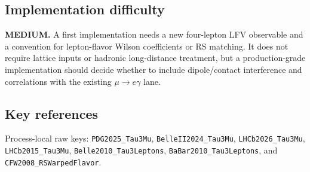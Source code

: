 \subsection*{Implementation difficulty}
\textbf{MEDIUM.}  A first implementation needs a new four-lepton LFV observable
and a convention for lepton-flavor Wilson coefficients or RS matching.  It
does not require lattice inputs or hadronic long-distance treatment, but a
production-grade implementation should decide whether to include dipole/contact
interference and correlations with the existing \(\mu\to e\gamma\) lane.

\subsection*{Key references}
Process-local raw keys: \texttt{PDG2025\_Tau3Mu},
\texttt{BelleII2024\_Tau3Mu}, \texttt{LHCb2026\_Tau3Mu},
\texttt{LHCb2015\_Tau3Mu}, \texttt{Belle2010\_Tau3Leptons},
\texttt{BaBar2010\_Tau3Leptons}, and \texttt{CFW2008\_RSWarpedFlavor}.
